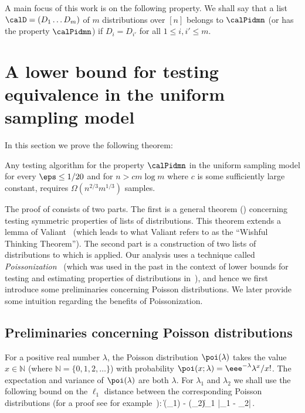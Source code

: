 %
%
%
%
%
%

A main focus of this work is on the following property.
We shall say that a list $\calD = (D_1 \ldots D_m)$ of $m$ distributions over $[n]$
belongs to $\calPidmn$ (or has the property $\calPidmn$) if $D_i = D_{i'}$ for all
$1 \leq i, i' \leq m$.

\section{A lower bound for testing equivalence 
in the uniform sampling model}\label{id-lb.sec}
%
In this section we prove the following theorem:
\begin{theorem}
\label{lb1.thm}
Any testing algorithm for the property  $\calPidmn$  in the uniform sampling model
for every $\eps \leq 1/20$ and for
 $n > c m\log m$ where $c$ is some sufficiently large
constant,
%
%
requires $\Omega(n^{2/3}m^{1/3})$ samples.
%
%
%
%
\end{theorem}
The proof of  consists of two parts. The first
is a general theorem ()
concerning testing  symmetric properties of lists of distributions.
%
%
This theorem extends
 a lemma of Valiant~\cite[Lem. 4.5.4]{valphd}
(which leads to what Valiant refers to as
the ``Wishful Thinking Theorem''). The second part is a construction of
two lists of distributions to which  is applied.
Our analysis uses a technique called \emph{Poissonization}~\cite{szpankowski}
(which was used in the past in the context of lower bounds for testing and estimating
properties of distributions in~\cite{RRSS,val,valphd}),
and hence we first introduce some preliminaries concerning Poisson distributions.
%
We later provide some intuition regarding the benefits of Poissonization.




\subsection{Preliminaries concerning Poisson distributions}
\label{prel-poiss.subsec}
\sloppy
For a positive real number $\lambda$,
the Poisson distribution $\poi(\lambda)$ takes the value
$x \in \mathbb{N}$ (where $\mathbb{N} = \{0,1,2,\ldots\}$) with
probability $\poi(x;\lambda) = \eee^{-\lambda} \lambda^x/x!$.
The expectation and variance of $\poi(\lambda)$ are both $\lambda$.
For $\lambda_1$ and $\lambda_2$ we shall use the following bound
on the $\ell_1$ distance between the corresponding Poisson distributions
(for a proof see for example~\cite[Claim A.2]{RRSS}):
\BEQ
\|\poi(\lambda_1) - \poi(\lambda_2)\|_1 |\lambda_1 - \lambda_2|\,.
\label{poi-stat.eq}
\EEQ

